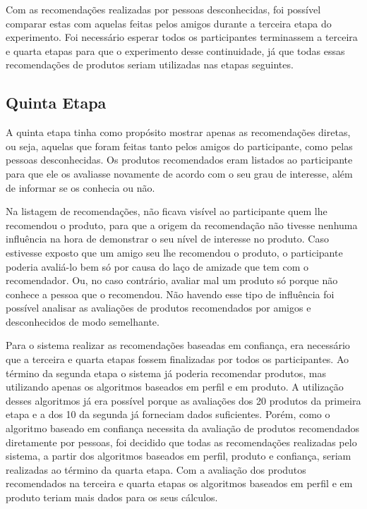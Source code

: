 Com as recomendações realizadas por pessoas desconhecidas, foi possível comparar estas com aquelas feitas pelos amigos durante a terceira etapa do experimento. Foi necessário esperar todos os participantes terminassem a terceira e quarta etapas para que o experimento desse continuidade, já que todas essas recomendações de produtos seriam utilizadas nas etapas seguintes.

\subsection{Quinta Etapa}

A quinta etapa tinha como propósito mostrar apenas as recomendações diretas, ou seja, aquelas que foram feitas tanto pelos amigos do participante, como pelas pessoas desconhecidas. Os produtos recomendados eram listados ao participante para que ele os avaliasse novamente de acordo com o seu grau de interesse, além de informar se os conhecia ou não.

Na listagem de recomendações, não ficava visível ao participante quem lhe recomendou o produto, para que a origem da recomendação não tivesse nenhuma influência na hora de demonstrar o seu nível de interesse no produto. Caso estivesse exposto que um amigo seu lhe recomendou o produto, o participante poderia avaliá-lo bem só por causa do laço de amizade que tem com o recomendador. Ou, no caso contrário, avaliar mal um produto só porque não conhece a pessoa que o recomendou. Não havendo esse tipo de influência foi possível analisar as avaliações de produtos recomendados por amigos e desconhecidos de modo semelhante.

Para o sistema realizar as recomendações baseadas em confiança, era necessário que a terceira e quarta etapas fossem finalizadas por todos os participantes. Ao término da segunda etapa o sistema já poderia recomendar produtos, mas utilizando apenas os algoritmos baseados em perfil e em produto. A utilização desses algoritmos já era possível porque as avaliações dos 20 produtos da primeira etapa e a dos 10 da segunda já forneciam dados suficientes. Porém, como o algoritmo baseado em confiança necessita da avaliação de produtos recomendados diretamente por pessoas, foi decidido que todas as recomendações realizadas pelo sistema, a partir dos algoritmos baseados em perfil, produto e confiança, seriam realizadas ao término da quarta etapa. Com a avaliação dos produtos recomendados na terceira e quarta etapas os algoritmos baseados em perfil e em produto teriam mais dados para os seus cálculos.

